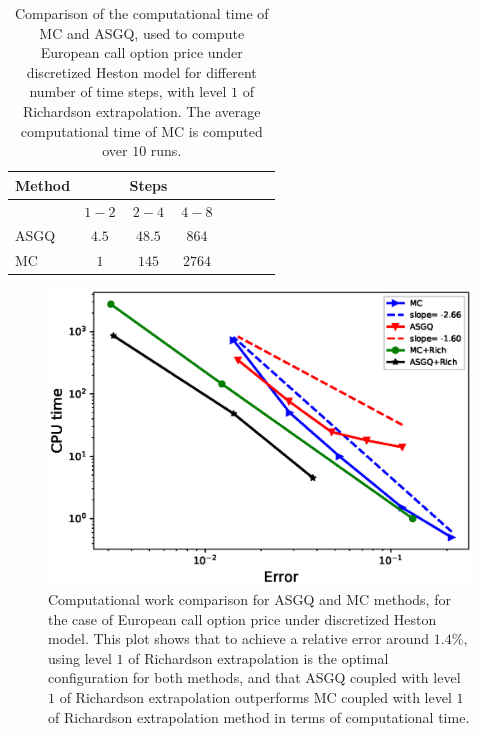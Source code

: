 \begin{table}[h!]
	\centering
	\begin{tabular}{l*{6}{c}r}
		\toprule[1.5pt]
	Method & & Steps  & &      &\\
	\hline
	         & $1-2$ & $2-4$  & $4-8$ \\
	         	\hline
		ASGQ & $4.5$  & $48.5$ & $864$  \\
				MC  &   $1$& $145$& $2764$   \\
		\bottomrule[1.25pt]
	\end{tabular}
	\caption{Comparison of the computational time of  MC and ASGQ, used to compute European call option price under discretized Heston model for different number of time steps, with level $1$ of Richardson extrapolation. The average computational time of MC is computed over $10$ runs.}
	\label{table:The computational time of  ASGQ, used to compute European call option price under discretized Heston model for different number of time steps, with level $1$ Richardson extrapolation.}
\end{table}


\FloatBarrier
	\begin{figure}[h!]
\centering
\includegraphics[width=0.5\linewidth]{./figures/Heston_single_call_smooth_vol/complexity_rates/set1/error_vs_time}

\caption{Computational work comparison for ASGQ and MC methods, for the case of European call option price under discretized Heston model. This plot shows that to achieve a relative error around $1.4\%$, using level $1$ of Richardson extrapolation is the optimal configuration for both methods, and that ASGQ coupled with level $1$ of Richardson extrapolation  outperforms  MC coupled with level $1$ of Richardson extrapolation  method in terms of computational time.}
\label{fig:Complexity plot for MC and MISC , European call option price under discretized Heston model}
\end{figure}
\FloatBarrier


